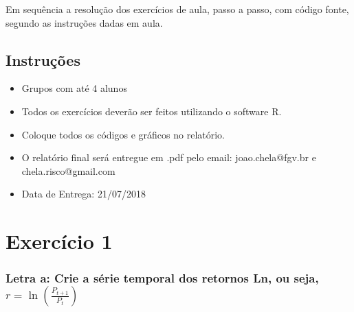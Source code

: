 \label{chap:Exercicios} Em sequência a resolução dos exercícios de aula, passo a passo, com código fonte, segundo as instruções dadas em aula.

\section{Instruções}

\begin{itemize}
\item{Grupos com até 4 alunos}
\item{Todos os exercícios deverão ser feitos utilizando o software R.}
\item{Coloque todos os códigos e gráficos  no relatório.}
\item{O relatório  final será entregue em .pdf pelo email: joao.chela@fgv.br e chela.risco@gmail.com}
\item{Data de Entrega: 21/07/2018}
\end{itemize}

\chapter{Exercício 1}

\subsection{Letra a: Crie a série temporal dos retornos Ln, ou seja, $r=\ln(\frac{P_{t+1}}{P_{t}})$}

\inputminted{R}{Src/R/ex1a.R}
